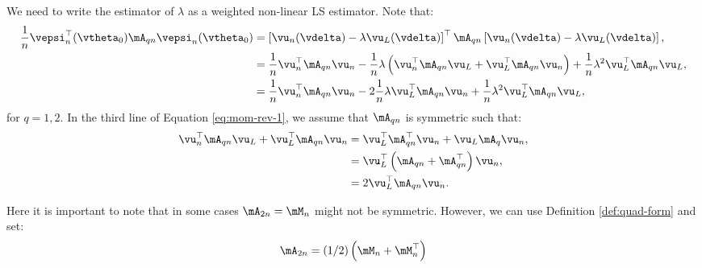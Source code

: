 \documentclass[english,12pt]{book}\usepackage[]{graphicx}\usepackage[]{xcolor}
\begin{document}
We need to write the estimator of $\lambda$ as a weighted non-linear LS estimator. Note that:
\begin{equation}\label{eq:mom-rev-1}
\begin{aligned}
  \frac{1}{n}\vepsi^\top_n(\vtheta_0)\mA_{qn}\vepsi_n(\vtheta_0) & = \left[\vu_n(\vdelta) - \lambda \vu_L(\vdelta)\right]^\top \mA_{qn} \left[\vu_n(\vdelta) - \lambda \vu_L(\vdelta)\right], \\
                               & = \frac{1}{n}\vu^\top_n\mA_{qn}\vu_n - \frac{1}{n}\lambda\left(\vu^\top_n\mA_{qn}\vu_L + \vu_L^\top\mA_{qn}\vu_n\right) +\frac{1}{n}\lambda^2\vu_L^\top\mA_{qn}\vu_L, \\
                               & = \frac{1}{n}\vu^\top_n\mA_{qn}\vu_n - 2\frac{1}{n}\lambda\vu_L^\top\mA_{qn}\vu_n +\frac{1}{n}\lambda^2\vu_L^\top\mA_{qn}\vu_L, \\
\end{aligned}
\end{equation}
%
for $q = 1, 2$. In the third line of Equation \eqref{eq:mom-rev-1}, we assume that $\mA_{qn}$ is symmetric such that:
\begin{equation*}
\begin{aligned}
\vu^\top_n\mA_{qn}\vu_L + \vu_L^\top\mA_{qn}\vu_n & = \vu_L^\top \mA_{qn}^\top\vu_n + \vu_L\mA_q\vu_n, \\
                                        & = \vu_L^\top\left(\mA_{qn} + \mA_{qn}^\top\right) \vu_n, \\
                                        & = 2\vu_L^\top\mA_{qn}\vu_n.
                                        \end{aligned}
\end{equation*}

Here it is important to note that in some cases $\mA_{2n} = \mM_n$ might not be symmetric. However, we can use Definition \ref{def:quad-form} and set:
\begin{equation}\label{eq:trick-A2}
\mA_{2n} = (1/2)\left(\mM_n + \mM^\top_n\right)
\end{equation}
\end{document}
